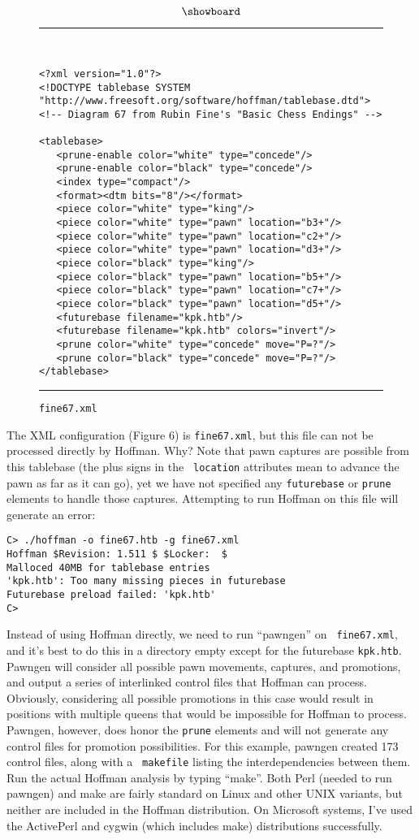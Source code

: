 \documentclass[11pt]{article}
\begin{document}
$$\showboard$$

\begin{figure}
\hrule\ 
{\small\begin{verbatim}
<?xml version="1.0"?>
<!DOCTYPE tablebase SYSTEM "http://www.freesoft.org/software/hoffman/tablebase.dtd">
<!-- Diagram 67 from Rubin Fine's "Basic Chess Endings" -->

<tablebase>
   <prune-enable color="white" type="concede"/>
   <prune-enable color="black" type="concede"/>
   <index type="compact"/>
   <format><dtm bits="8"/></format>
   <piece color="white" type="king"/>
   <piece color="white" type="pawn" location="b3+"/>
   <piece color="white" type="pawn" location="c2+"/>
   <piece color="white" type="pawn" location="d3+"/>
   <piece color="black" type="king"/>
   <piece color="black" type="pawn" location="b5+"/>
   <piece color="black" type="pawn" location="c7+"/>
   <piece color="black" type="pawn" location="d5+"/>
   <futurebase filename="kpk.htb"/>
   <futurebase filename="kpk.htb" colors="invert"/>
   <prune color="white" type="concede" move="P=?"/>
   <prune color="black" type="concede" move="P=?"/>
</tablebase>
\end{verbatim}}
\hrule
\caption{\tt fine67.xml}
\end{figure}

The XML configuration (Figure 6) is {\tt fine67.xml}, but this file
can not be processed directly by Hoffman.  Why?  Note that pawn
captures are possible from this tablebase (the plus signs in the {\tt
location} attributes mean to advance the pawn as far as it can go),
yet we have not specified any {\tt futurebase} or {\tt prune} elements
to handle those captures.  Attempting to run Hoffman on this file will
generate an error:

\begin{verbatim}
C> ./hoffman -o fine67.htb -g fine67.xml
Hoffman $Revision: 1.511 $ $Locker:  $
Malloced 40MB for tablebase entries
'kpk.htb': Too many missing pieces in futurebase
Futurebase preload failed: 'kpk.htb'
C>
\end{verbatim}

Instead of using Hoffman directly, we need to run ``pawngen'' on {\tt
fine67.xml}, and it's best to do this in a directory empty except for
the futurebase {\tt kpk.htb}.  Pawngen will consider all possible pawn
movements, captures, and promotions, and output a series of
interlinked control files that Hoffman can process.  Obviously,
considering all possible promotions in this case would result in
positions with multiple queens that would be impossible for Hoffman to
process.  Pawngen, however, does honor the {\tt prune} elements and
will not generate any control files for promotion possibilities.  For
this example, pawngen created 173 control files, along with a {\tt
makefile} listing the interdependencies between them.  Run the actual
Hoffman analysis by typing ``make''.  Both Perl (needed to run
pawngen) and make are fairly standard on Linux and other UNIX
variants, but neither are included in the Hoffman distribution.  On
Microsoft systems, I've used the ActivePerl and cygwin (which includes
make) distributions successfully.
\end{document}
